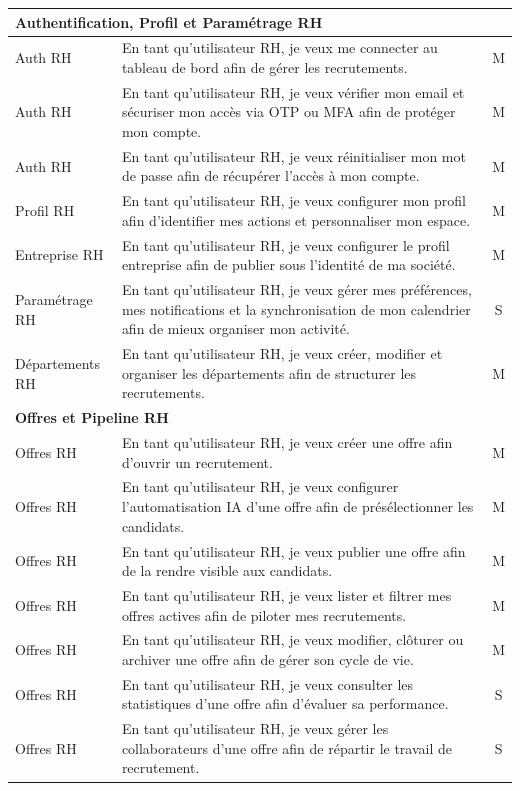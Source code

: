 \begin{longtable}{|p{3.5cm}|p{10cm}|c|}
\multicolumn{3}{|l|}{\textbf{Authentification, Profil et Paramétrage RH}} \\ \hline
Auth RH & En tant qu'utilisateur RH, je veux me connecter au tableau de bord afin de gérer les recrutements. & M \\ \hline
Auth RH & En tant qu'utilisateur RH, je veux vérifier mon email et sécuriser mon accès via OTP ou MFA afin de protéger mon compte. & M \\ \hline
Auth RH & En tant qu'utilisateur RH, je veux réinitialiser mon mot de passe afin de récupérer l'accès à mon compte. & M \\ \hline
Profil RH & En tant qu'utilisateur RH, je veux configurer mon profil afin d'identifier mes actions et personnaliser mon espace. & M \\ \hline
Entreprise RH & En tant qu'utilisateur RH, je veux configurer le profil entreprise afin de publier sous l'identité de ma société. & M \\ \hline
Paramétrage RH & En tant qu'utilisateur RH, je veux gérer mes préférences, mes notifications et la synchronisation de mon calendrier afin de mieux organiser mon activité. & S \\ \hline
Départements RH & En tant qu'utilisateur RH, je veux créer, modifier et organiser les départements afin de structurer les recrutements. & M \\ \hline
\multicolumn{3}{|l|}{\textbf{Offres et Pipeline RH}} \\ \hline
Offres RH & En tant qu'utilisateur RH, je veux créer une offre afin d'ouvrir un recrutement. & M \\ \hline
Offres RH & En tant qu'utilisateur RH, je veux configurer l'automatisation IA d'une offre afin de présélectionner les candidats. & M \\ \hline
Offres RH & En tant qu'utilisateur RH, je veux publier une offre afin de la rendre visible aux candidats. & M \\ \hline
Offres RH & En tant qu'utilisateur RH, je veux lister et filtrer mes offres actives afin de piloter mes recrutements. & M \\ \hline
Offres RH & En tant qu'utilisateur RH, je veux modifier, clôturer ou archiver une offre afin de gérer son cycle de vie. & M \\ \hline
Offres RH & En tant qu'utilisateur RH, je veux consulter les statistiques d'une offre afin d'évaluer sa performance. & S \\ \hline
Offres RH & En tant qu'utilisateur RH, je veux gérer les collaborateurs d'une offre afin de répartir le travail de recrutement. & S \\ \hline

\end{longtable}
